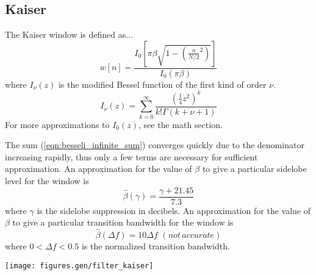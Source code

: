 \subsection{Kaiser}
\label{ch:filterdesign:window:kaiser}
The Kaiser window is defined as...
\begin{equation}
\label{eqn:kaiser_window}
w[n] = \frac{I_0\left[\pi\beta\sqrt{1-\left(\frac{n}{N/2}^2\right)}\right]}{I_0\left(\pi\beta\right)}
\end{equation}
where $I_\nu(z)$ is the modified Bessel function of the first kind of order $\nu$.
\begin{equation}
\label{eqn:besseli_infinite_sum}
I_\nu(z) = \sum_{k=0}^{\infty}{\frac{\left(\frac{1}{4}z^2\right)^k}{k!\Gamma(k+\nu+1)}}
\end{equation}
For more approximations to $I_0(z)$, see the math section.

The sum (\ref{eqn:besseli_infinite_sum}) converges quickly due to the
denominator increasing rapidly, thus only a few terms are necessary for
sufficient approximation.
An approximation for the value of $\beta$ to give a particular sidelobe level
for the window is
\begin{equation}
\hat{\beta}(\gamma) = \frac{\gamma + 21.45}{7.3}
\end{equation}
where $\gamma$ is the sidelobe suppression in decibels.
An approximation for the value of $\beta$ to give a particular transition
bandwidth for the window is
\begin{equation}
\hat{\beta}(\Delta f) = 10\Delta f \,\, (not\, accurate)
\end{equation}
where $0 < \Delta f < 0.5$ is the normalized transition bandwidth.


\texttt{[image: figures.gen/filter\_kaiser]}

